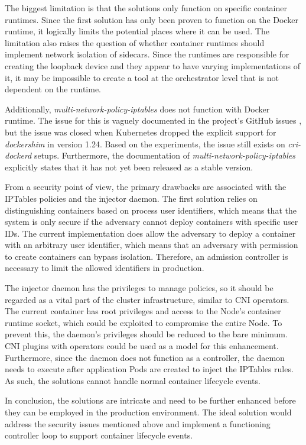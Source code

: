 \documentclass[english, 12pt, a4paper, sci, utf8, a-2b, online]{aaltothesis}
\begin{document}
The biggest limitation is that the solutions only function on specific container runtimes.
Since the first solution has only been proven to function on the Docker runtime, it logically limits the potential places where it can be used.
The limitation also raises the question of whether container runtimes should implement network isolation of sidecars.
Since the runtimes are responsible for creating the loopback device and they appear to have varying implementations of it, it may be impossible to create a tool at the orchestrator level that is not dependent on the runtime.

Additionally, \emph{multi-network-policy-iptables} does not function with Docker runtime.
The issue for this is vaguely documented in the project's GitHub issues \cite{multi-network-policy-iptables-bug}, but the issue was closed when Kubernetes dropped the explicit support for \emph{dockershim} in version 1.24.
Based on the experiments, the issue still exists on \emph{cri-dockerd} setups.
Furthermore, the documentation of \emph{multi-network-policy-iptables} explicitly states that it has not yet been released as a stable version.

From a security point of view, the primary drawbacks are associated with the IPTables policies and the injector daemon.
The first solution relies on distinguishing containers based on process user identifiers, which means that the system is only secure if the adversary cannot deploy containers with specific user IDs.
The current implementation does allow the adversary to deploy a container with an arbitrary user identifier, which means that an adversary with permission to create containers can bypass isolation.
Therefore, an admission controller is necessary to limit the allowed identifiers in production.

The injector daemon has the privileges to manage policies, so it should be regarded as a vital part of the cluster infrastructure, similar to CNI operators.
The current container has root privileges and access to the Node's container runtime socket, which could be exploited to compromise the entire Node.
To prevent this, the daemon's privileges should be reduced to the bare minimum.
CNI plugins with operators could be used as a model for this enhancement.
Furthermore, since the daemon does not function as a controller, the daemon needs to execute after application Pods are created to inject the IPTables rules.
As such, the solutions cannot handle normal container lifecycle events.

In conclusion, the solutions are intricate and need to be further enhanced before they can be employed in the production environment.
The ideal solution would address the security issues mentioned above and implement a functioning controller loop to support container lifecycle events.
\end{document}
